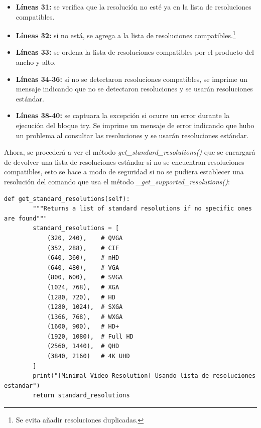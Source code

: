 \begin{itemize}
    \item \textbf{Líneas 31:} se verifica que la resolución no esté ya en la lista de resoluciones compatibles. 
    \item \textbf{Líneas 32:} si no está, se agrega a la lista de resoluciones compatibles.\footnote{Se evita añadir resoluciones duplicadas.}
    \item \textbf{Líneas 33:} se ordena la lista de resoluciones compatibles por el producto del ancho y alto.
    \item \textbf{Líneas 34-36:} si no se detectaron resoluciones compatibles, se imprime un mensaje indicando que no se detectaron resoluciones y se usarán resoluciones estándar.
    \item \textbf{Líneas 38-40:} se captuara la excepción si ocurre un error durante la ejecución del bloque try. Se imprime un mensaje de error indicando que hubo un problema al consultar las resoluciones y se usarán resoluciones estándar.
\end{itemize}
\vspace{\baselineskip}

Ahora, se procederá a ver el método \textit{get\_standard\_resolutions()} que se encargará de devolver una lista de resoluciones estándar si no se encuentran resoluciones compatibles, esto se hace a modo de seguridad si no se pudiera establecer una resolución del comando que usa el método \textit{\_get\_supported\_resolutions()}:
\begin{lstlisting}[style=pythonstyle, caption={Método get\_standard\_resolutions() de \textit{Minimal\_Video\_Resolution}}, label={lst:get_standard_resolutions_minimal_video_resolution}]
def get_standard_resolutions(self):
        """Returns a list of standard resolutions if no specific ones are found"""
        standard_resolutions = [
            (320, 240),    # QVGA
            (352, 288),    # CIF
            (640, 360),    # nHD
            (640, 480),    # VGA
            (800, 600),    # SVGA
            (1024, 768),   # XGA
            (1280, 720),   # HD
            (1280, 1024),  # SXGA
            (1366, 768),   # WXGA
            (1600, 900),   # HD+
            (1920, 1080),  # Full HD
            (2560, 1440),  # QHD
            (3840, 2160)   # 4K UHD
        ]
        print("[Minimal_Video_Resolution] Usando lista de resoluciones estandar")
        return standard_resolutions
\end{lstlisting}
\vspace{\baselineskip}

